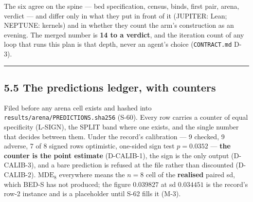 \documentclass[11pt,a4paper]{article}
\theoremstyle{plain}
\theoremstyle{definition}
\theoremstyle{remark}
\begin{document}
The six agree on the spine --- bed specification, census, binds, first
pair, arena, verdict --- and differ only in what they put in front of it
(JUPITER: Lean; NEPTUNE: kernels) and in whether they count the arm's
construction as an evening. The merged number is \textbf{14 to a
verdict}, and the iteration count of any loop that runs this plan is
that depth, never an agent's choice (\texttt{CONTRACT.md} D-3).

\begin{center}\rule{0.5\linewidth}{0.5pt}\end{center}

\subsection{5.5 The predictions ledger, with
counters}\label{the-predictions-ledger-with-counters}

Filed before any arena cell exists and hashed into
\texttt{results/arena/PREDICTIONS.sha256} (S-60). Every row carries a
counter of equal specificity (L-SIGN), the SPLIT band where one exists,
and the single number that decides between them. Under the record's
calibration --- 9 checked, 9 adverse, 7 of 8 signed rows optimistic,
one-sided sign test \(p=0.0352\) --- \textbf{the counter is the point
estimate} (D-CALIB-1), the sign is the only output (D-CALIB-3), and a
bare prediction is refused at the file rather than discounted
(D-CALIB-2). \(\mathrm{MDE}_8\) everywhere means the \(n=8\) cell of the
\textbf{realised} paired sd, which BED-S has not produced; the figure
\(0.039827\) at sd \(0.034451\) is the record's row-2 instance and is a
placeholder until S-62 fills it (M-3).
\end{document}
